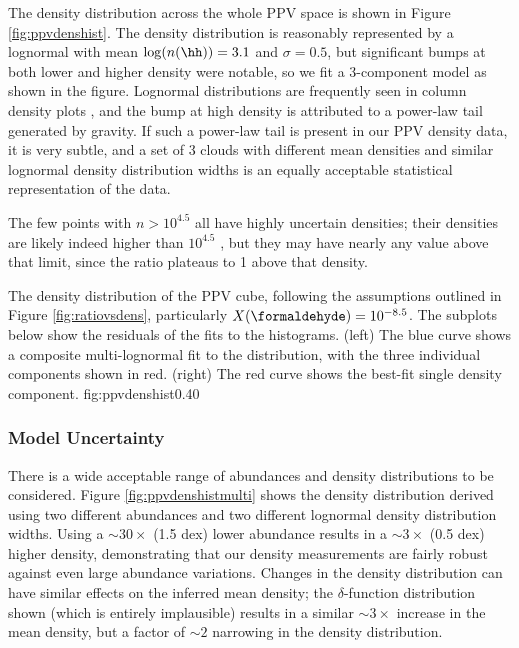 The density distribution across the whole PPV space is shown in Figure
\ref{fig:ppvdenshist}.  The density distribution
is reasonably represented by a lognormal with mean $\log(n(\hh))=3.1$ and
$\sigma=0.5$, but significant bumps at both lower and higher density were
notable, so we fit a 3-component model as shown in the figure.
Lognormal distributions are frequently seen in column density plots
\citep[e.g.]{Kainulainen2011a,Schneider2013a}, and the bump at high density is
attributed to a power-law tail generated by gravity.  If such a power-law tail
is present in our PPV density data, it is very subtle, and a set of 3 clouds
with different mean densities and similar lognormal density distribution widths
is an equally acceptable statistical representation of the data.

The few points with $n>10^{4.5}$ all have highly uncertain densities; their
densities are likely indeed higher than $10^{4.5}$ \percc, but they may have
nearly any value above that limit, since the \formaldehyde ratio plateaus to 1
above that density.


{The density distribution of the PPV cube, following the assumptions outlined
in Figure \ref{fig:ratiovsdens}, particularly $X(\formaldehyde)=10^{-8.5}$.
The subplots below show the residuals of the fits to the histograms.
(left)
The blue curve shows a composite multi-lognormal fit to the distribution,
with the three individual components shown in red.
(right) The red curve shows the best-fit single density component.}
{fig:ppvdenshist}{0.4}{0}

\subsubsection{Model Uncertainty}
There is a wide acceptable range of \formaldehyde abundances and \hh density
distributions to be considered.  Figure \ref{fig:ppvdenshistmulti} shows the
density distribution derived using two different abundances and two different
lognormal density distribution widths.  Using a $\sim30\times$ (1.5 dex) lower
abundance results in a $\sim3\times$ (0.5 dex) higher density, demonstrating
that our density measurements are fairly robust against even large abundance
variations.  Changes in the density distribution can have similar effects on
the inferred mean density; the $\delta$-function distribution shown (which is
entirely implausible) results in a similar $\sim3\times$ increase in the mean
density, but a factor of $\sim2$ narrowing in the density distribution.

